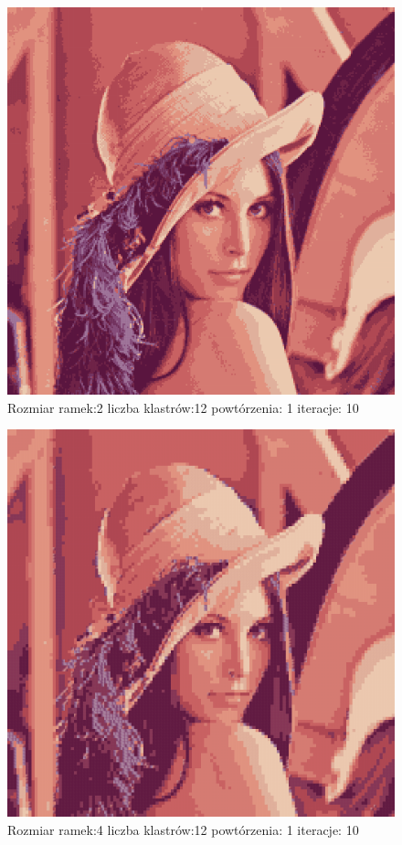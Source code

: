 \documentclass{classrep}
\begin{document}
{{{{\begin{figure}[!htbp]
\centering
\includegraphics[width=\textwidth,width=90mm]{obrazy/lenna_R2_K12_P1_It10.png}
\caption{Rozmiar ramek:2 liczba klastrów:12 powtórzenia: 1 iteracje: 10 }
\end{figure}

\begin{figure}[!htbp]
\centering
\includegraphics[width=\textwidth,width=90mm]{obrazy/lenna_R4_K12_P1_It10.png}
\caption{Rozmiar ramek:4 liczba klastrów:12 powtórzenia: 1 iteracje: 10 }
\end{figure}

}}}}
\end{document}
